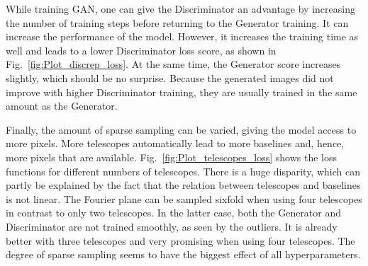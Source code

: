 While training GAN, one can give the Discriminator an advantage by increasing the number of training steps before returning to the Generator training. It can increase the performance of the model. However, it increases the training time as well and leads to a lower Discriminator loss score, as shown in Fig.~\ref{fig:Plot_discrep_loss}. At the same time, the Generator score increases slightly, which should be no surprise. Because the generated images did not improve with higher Discriminator training, they are usually trained in the same amount as the Generator.

Finally, the amount of sparse sampling can be varied, giving the model access to more pixels. More telescopes automatically lead to more baselines and, hence, more pixels that are available. Fig.~\ref{fig:Plot_telescopes_loss} shows the loss functions for different numbers of telescopes. There is a huge disparity, which can partly be explained by the fact that the relation between telescopes and baselines is not linear. The Fourier plane can be sampled sixfold when using four telescopes in contrast to only two telescopes. In the latter case, both the Generator and Discriminator are not trained smoothly, as seen by the outliers. It is already better with three telescopes and very promising when using four telescopes. The degree of sparse sampling seems to have the biggest effect of all hyperparameters. 
